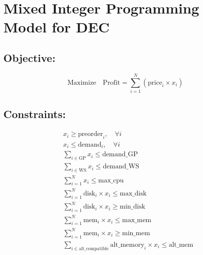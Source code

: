 \documentclass{article}
\begin{document}
\section*{Mixed Integer Programming Model for DEC}

\subsection*{Objective:}
\[
\text{Maximize} \quad \text{Profit} = \sum_{i=1}^{N} (\text{price}_i \times x_i)
\]

\subsection*{Constraints:}
\begin{align*}
& x_i \geq \text{preorder}_i, \quad \forall i \\
& x_i \leq \text{demand}_i, \quad \forall i \\
& \sum_{i \in \text{GP}} x_i \leq \text{demand\_GP} \\
& \sum_{i \in \text{WS}} x_i \leq \text{demand\_WS} \\
& \sum_{i=1}^{N} x_i \leq \text{max\_cpu} \\
& \sum_{i=1}^{N} \text{disk}_i \times x_i \leq \text{max\_disk} \\
& \sum_{i=1}^{N} \text{disk}_i \times x_i \geq \text{min\_disk} \\
& \sum_{i=1}^{N} \text{mem}_i \times x_i \leq \text{max\_mem} \\
& \sum_{i=1}^{N} \text{mem}_i \times x_i \geq \text{min\_mem} \\
& \sum_{i \in \text{alt\_compatible}} \text{alt\_memory}_i \times x_i \leq \text{alt\_mem} 
\end{align*}
\end{document}
